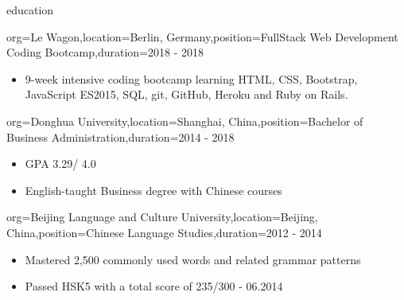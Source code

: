 \documentclass{resume}
\begin{document}
\begin{ResumeSection}{education}
    \begin{ResumeSubsection}{org={Le Wagon},location={Berlin, Germany},position={FullStack Web Development Coding Bootcamp},duration={2018 - 2018}}
        \begin{itemize}
            \item 9-week intensive coding bootcamp learning HTML, CSS, Bootstrap, JavaScript ES2015, SQL, git, GitHub, Heroku and Ruby on Rails.
        \end{itemize}
    \end{ResumeSubsection}

    \begin{ResumeSubsection}{org={Donghua University},location={Shanghai, China},position={Bachelor of Business Administration},duration={2014 - 2018}}
        \begin{itemize}
            \item GPA 3.29/ 4.0
            \item English-taught Business degree with Chinese courses
        \end{itemize}
    \end{ResumeSubsection}

    \begin{ResumeSubsection}{org={Beijing Language and Culture University},location={Beijing, China},position={Chinese Language Studies},duration={2012 - 2014}}
        \begin{itemize}
            \item Mastered 2,500 commonly used words and related grammar patterns
            \item Passed HSK5 with a total score of 235/300 - 06.2014
        \end{itemize}
    \end{ResumeSubsection}
\end{ResumeSection}
\end{document}

